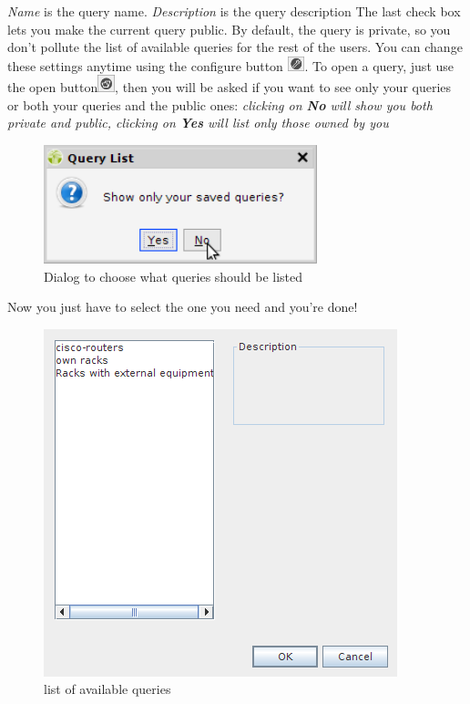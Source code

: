 \documentclass[a4paper]{article}
\begin{document}
	\textit{Name} is the query name.
	\textit{Description} is the query description
	The last check box lets you make the current query public. By default, the query is private, so you don't pollute the list of available queries for the rest of the users. You can change these settings anytime using the configure button \includegraphics[width=0.5cm]{img/icon_edit_saved_query.png}.
	To open a query, just use the open button\includegraphics[width=0.5cm]{img/icon_open.png}, then you will be asked if you want to see only your queries or both your queries and the public ones:
	\textit{clicking on \textbf{No} will show you both private and public, clicking on \textbf{Yes} will list only those owned by you}
	\begin{figure}[h!]
		\centering
		\includegraphics[width=0.5\linewidth]{img/query_save_as_private.png}
		\caption{Dialog to choose what queries should be listed}
		\label{fig:query_save_as_private}
	\end{figure}
	
	Now you just have to select the one you need and you're done! 
	\begin{figure}[h!]
		\centering
		\includegraphics[width=0.5\linewidth]{img/query_saved_queries.png}
		\caption{list of available queries}
		\label{fig:query_saved_queries}
	\end{figure}
	
\end{document}
